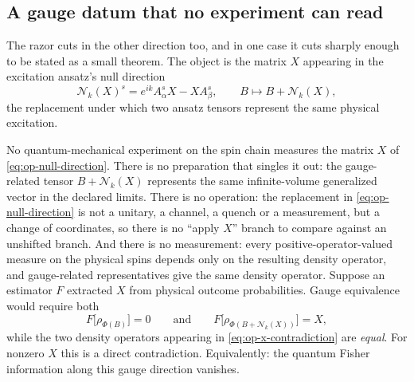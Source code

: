
\subsection{A gauge datum that no experiment can read}
\label{sec:op-impossibility}

The razor cuts in the other direction too, and in one case it cuts sharply
enough to be stated as a small theorem. The object is the matrix $X$ appearing
in the excitation ansatz's null direction
\begin{equation}
  \mathcal{N}_k(X)^s=e^{ik}A_\alpha^s X-X A_\beta^s,
  \qquad B\longmapsto B+\mathcal{N}_k(X),
  \label{eq:op-null-direction}
\end{equation}
the replacement under which two ansatz tensors represent the same physical
excitation.

\begin{observation}
\label{obs:op-x-impossible}
No quantum-mechanical experiment on the spin chain measures the matrix $X$ of
\eqref{eq:op-null-direction}. There is no preparation that singles it out: the
gauge-related tensor $B+\mathcal{N}_k(X)$ represents the same infinite-volume
generalized vector in the declared limits. There is no operation: the
replacement in \eqref{eq:op-null-direction} is not a unitary, a channel, a
quench or a measurement, but a change of coordinates, so there is no ``apply
$X$'' branch to compare against an unshifted branch. And there is no
measurement: every positive-operator-valued measure on the physical spins
depends only on the resulting density operator, and gauge-related
representatives give the same density operator. Suppose an estimator $F$
extracted $X$ from physical outcome probabilities. Gauge equivalence would
require both
\begin{equation}
  F\bigl[\rho_{\Phi(B)}\bigr]=0
  \qquad\text{and}\qquad
  F\bigl[\rho_{\Phi(B+\mathcal{N}_k(X))}\bigr]=X ,
  \label{eq:op-x-contradiction}
\end{equation}
while the two density operators appearing in \eqref{eq:op-x-contradiction} are
\emph{equal}. For nonzero $X$ this is a direct contradiction. Equivalently: the
quantum Fisher information along this gauge direction vanishes.
\end{observation}

